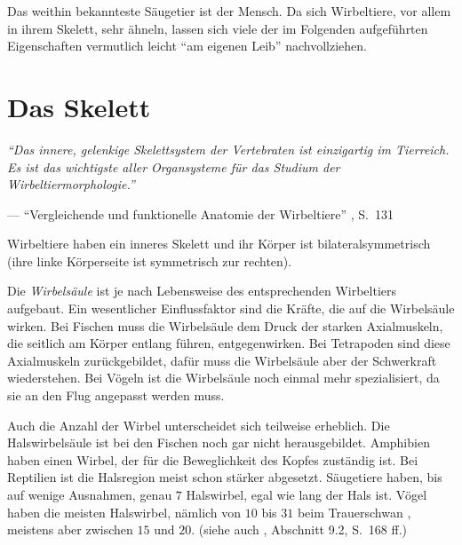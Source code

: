 Das weithin bekannteste Säugetier ist der Mensch. Da sich Wirbeltiere, vor allem in ihrem Skelett, sehr ähneln, lassen sich viele der im Folgenden aufgeführten Eigenschaften vermutlich leicht "`am eigenen Leib"' nachvollziehen.


\section{Das Skelett}
\label{biology_skeleton}

\vspace{0.5cm}
\begin{center}
 \begin{minipage}{12cm}
  \emph{"`Das innere, gelenkige Skelettsystem der Vertebraten ist einzigartig im Tierreich. Es ist das wichtigste aller Organsysteme für das Studium der Wirbeltiermorphologie."'}
 
  --- "`Vergleichende und funktionelle Anatomie der Wirbeltiere"' \cite{Vergleichende_Anatomie}, S.\ 131
 \end{minipage}
\end{center}

Wirbeltiere haben ein inneres Skelett und ihr Körper ist bilateralsymmetrisch (ihre linke Körperseite ist symmetrisch zur rechten). 

Die \emph{Wirbelsäule} ist je nach Lebensweise des entsprechenden Wirbeltiers aufgebaut. Ein wesentlicher Einflussfaktor sind die Kräfte, die auf die Wirbelsäule wirken. 
Bei Fischen muss die Wirbelsäule dem Druck der starken Axialmuskeln, die seitlich am Körper entlang führen, entgegenwirken.
Bei Tetrapoden sind diese Axialmuskeln zurückgebildet, dafür muss die Wirbelsäule aber der Schwerkraft wiederstehen.
Bei Vögeln ist die Wirbelsäule noch einmal mehr spezialisiert, da sie an den Flug angepasst werden muss.

Auch die Anzahl der Wirbel unterscheidet sich teilweise erheblich. 
Die Halswirbelsäule ist \zb bei den Fischen noch gar nicht herausgebildet. Amphibien haben einen Wirbel, der für die Beweglichkeit des Kopfes zuständig ist. Bei Reptilien ist die Halsregion meist schon stärker abgesetzt. Säugetiere haben, bis auf wenige Ausnahmen, genau $7$ Halswirbel, egal wie lang der Hals ist. Vögel haben die meisten Halswirbel, nämlich von $10$ bis $31$ beim Trauerschwan \cite{WikipediaVogelskelett}, meistens aber zwischen $15$ und $20$. (siehe auch \cite{Vergleichende_Anatomie}, Abschnitt 9.2, S.\ 168 ff.)

